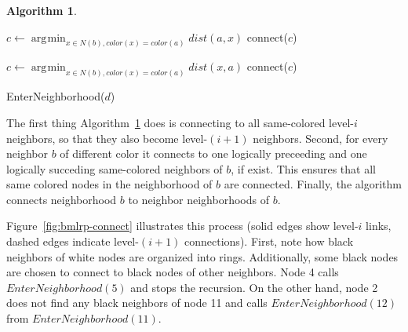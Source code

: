 \documentclass[14pt]{extarticle}
\theoremstyle{definition}
\newtheorem{algo}{Algorithm}
\DeclareMathOperator*{\argmin}{\arg\!\min}
\begin{document}
\begin{algo}
\begin{samepage}
\begin{algorithmic}[1]
                    \State $c \gets \argmin_{x \in N(b), color(x) = color(a)} dist(a,x)$
                        \State connect($c$)     
                    \EndIf

                    \State $c \gets \argmin_{x \in N(b), color(x) = color(a)} dist(x,a)$
                        \State connect($c$)     
                    \EndIf

                        \If {$\argmin_{x \in N(b), color(x) = color(a)} dist(x,a) = a$}
                            \State EnterNeighborhood($d$)   
                        \EndIf
                    \EndFor
                \EndIf
            \EndFor
        \EndFunction
    \end{algorithmic}
    \end{samepage}

    \label{alg:connect}
\end{algo}

The first thing Algorithm~\ref{alg:connect} does is connecting to all same-colored level-$i$ neighbors, so that they also become level-$(i+1)$ neighbors. Second, for every neighbor $b$ of different color it connects to one logically preceeding and one logically succeding same-colored neighbors of $b$, if exist. This ensures that all same colored nodes in the neighborhood of $b$ are connected. Finally, the algorithm connects neighborhood $b$ to neighbor neighborhoods of $b$.

Figure~\ref{fig:bmlrp-connect} illustrates this process (solid edges show level-$i$ links, dashed edges indicate level-$(i+1)$ connections). First, note how black neighbors of white nodes are organized into rings. Additionally, some black nodes are chosen to connect to black nodes of other neighbors. Node 4 calls $EnterNeighborhood(5)$ and stops the recursion. On the other hand, node 2 does not find any black neighbors of node 11 and calls $EnterNeighborhood(12)$ from $EnterNeighborhood(11)$.





\end{document}

